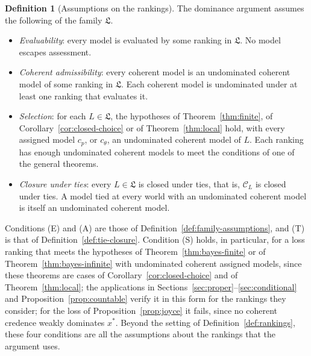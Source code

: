 \documentclass[11pt]{article}
\theoremstyle{definition}
\newtheorem{definition}[theorem]{Definition}
\theoremstyle{remark}
\newcommand{\C}{\mathcal C}
\newcommand{\Lf}{\mathfrak L}
\begin{document}
\begin{definition}[Assumptions on the rankings]\label{def:argument-assumptions}
The dominance argument assumes the following of the family $\Lf$.
\begin{itemize}[leftmargin=2.4em,labelsep=0.5em]
\item[\textbf{(E)}] \emph{Evaluability}: every model is evaluated by some ranking in $\Lf$. No model escapes assessment.
\item[\textbf{(A)}] \emph{Coherent admissibility}: every coherent model is an undominated coherent model of some ranking in $\Lf$. Each coherent model is undominated under at least one ranking that evaluates it.
\item[\textbf{(S)}] \emph{Selection}: for each $L\in\Lf$, the hypotheses of Theorem~\ref{thm:finite}, of Corollary~\ref{cor:closed-choice} or of Theorem~\ref{thm:local} hold, with every assigned model $c_p$, or $c_\theta$, an undominated coherent model of $L$. Each ranking has enough undominated coherent models to meet the conditions of one of the general theorems.
\item[\textbf{(T)}] \emph{Closure under ties}: every $L\in\Lf$ is closed under ties, that is, $\C_L$ is closed under ties. A model tied at every world with an undominated coherent model is itself an undominated coherent model.
\end{itemize}
\end{definition}

Conditions (E) and (A) are those of Definition~\ref{def:family-assumptions}, and (T) is that of Definition~\ref{def:tie-closure}. Condition (S) holds, in particular, for a loss ranking that meets the hypotheses of Theorem~\ref{thm:bayes-finite} or of Theorem~\ref{thm:bayes-infinite} with undominated coherent assigned models, since these theorems are cases of Corollary~\ref{cor:closed-choice} and of Theorem~\ref{thm:local}; the applications in Sections~\ref{sec:proper}--\ref{sec:conditional} and Proposition~\ref{prop:countable} verify it in this form for the rankings they consider; for the loss of Proposition~\ref{prop:joyce} it fails, since no coherent credence weakly dominates $x^*$. Beyond the setting of Definition~\ref{def:rankings}, these four conditions are all the assumptions about the rankings that the argument uses.
\end{document}
